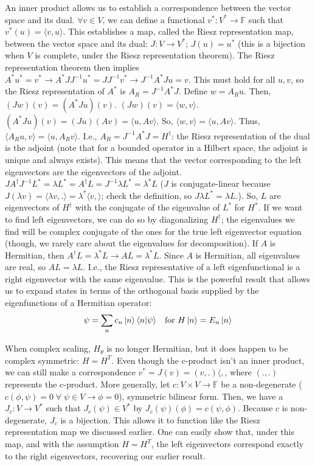 \documentclass[11pt]{article}
\begin{document}
	An inner product allows us to establish a correspondence between the vector space and its dual. $\forall v \in V$, we can define a functional $v^*: V^*\rightarrow \mathbb{F}$ such that $v^*(u) = \langle v, u\rangle$. This establishes a map, called the Riesz representation map, between the vector space and its dual: $J: V\rightarrow V^*$; $J(u) = u^*$ (this is a bijection when $V$ is complete, under the Riesz representation theorem). The Riesz representation theorem then implies $A^*u^*=v^*\rightarrow A^*JJ^{-1}u^* = JJ^{-1}v^*\rightarrow J^{-1}A^*Ju=v$. This must hold for all $u, v$, so the Riesz representation of $A^*$ is $A_R = J^{-1}A^*J$. Define $w=A_Ru$. Then, $(Jw)(v) = (A^*Ju)(v)$. $(Jw)(v) = \langle w, v\rangle$. $(A^*Ju)(v) = (Ju)(Av) = \langle u, Av\rangle$. So, $\langle w, v\rangle = \langle u, Av\rangle$. Thus, $\langle A_Ru, v\rangle=\langle u, A_Rv\rangle$. I.e., $A_R = J^{-1}A^* J= H^\dagger$: the Riesz representation of the dual is the adjoint (note that for a bounded operator in a Hilbert space, the adjoint is unique and always exists). This means that the vector corresponding to the left eigenvectors are the eigenvectors of the adjoint. $JA^\dagger J^{-1}L^* = \lambda L^* = A^\dagger L = J^{-1}\lambda L^* = \lambda^* L$ ($J$ is conjugate-linear because $J(\lambda v)=\langle \lambda v, .\rangle = \lambda^*\langle v, \rangle$; check the definition, so $J\lambda L^* = \lambda L$.). So, $L$ are eigenvectors of $H^\dagger$ with the conjugate of the eigenvalue of $L^*$ for $H^*$. If we want to find left eigenvectors, we can do so by diagonalizing $H^\dagger$; the eigenvalues we find will be complex conjugate of the ones for the true left eigenvector equation (though, we rarely care about the eigenvalues for decomposition). If $A$ is Hermitian, then $A^\dagger L = \lambda^* L\rightarrow AL=\lambda^*L$. Since $A$ is Hermitian, all eigenvalues are real, so $AL = \lambda L$. I.e., the Riesz representative of a left eigenfunctional is a right eigenvector with the same eigenvalue. This is the powerful result that allows us to expand states in terms of the orthogonal basis supplied by the eigenfunctions of a Hermitian operator:
	$$
		\psi = \sum_n c_n \ket{n} \langle n | \psi \rangle\quad \text{for } H\ket{n}=E_n \ket{n}
	$$
	
	When complex scaling, $H_\theta$ is no longer Hermitian, but it does happen to be complex symmetric: $H=H^T$. Even though the c-product isn't an inner product, we can still make a correspondence $v^* = J(v) = (v, .)\langle,$, where $(., .)$ represents the c-product. More generally, let $c: V\times V\rightarrow \mathbb{F}$ be a non-degenerate ($c(\phi, \psi) = 0 \;\forall\; \psi\in V\rightarrow \phi=0$), symmetric bilinear form. Then, we have a $J_c: V\rightarrow V^*$ such that $J_c(\psi) \in V^*$ by $J_c(\psi)(\phi) = c(\psi, \phi)$. Because $c$ is non-degenerate, $J_c$ is a bijection. This allows it to function like the Riesz representation map we discussed earlier. One can easily show that, under this map, and with the assumption $H=H^T$, the left eigenvectors correspond exactly to the right eigenvectors, recovering our earlier result.
	
\end{document}
